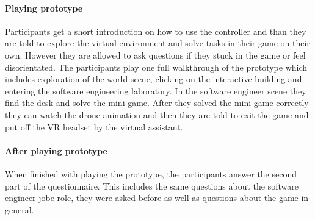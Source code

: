\paragraph{Playing prototype} Participants get a short introduction on how to use the controller and than they are told to explore the virtual environment and solve tasks in their game on their own. However they are allowed to ask questions if they stuck in the game or feel disorientated. The participants play one full walkthrough of the prototype which includes exploration of the world scene, clicking on the interactive building and entering the software engineering laboratory. In the software engineer scene they find the desk and solve the mini game. After they solved the mini game correctly they can watch the drone animation and then they are told to exit the game and put off the VR headset by the virtual assistant.
\paragraph{After playing prototype} When finished with playing the prototype, the participants answer the second part of the questionnaire. This includes the same questions about the software engineer jobe role, they were asked before as well as questions about the game in general.

